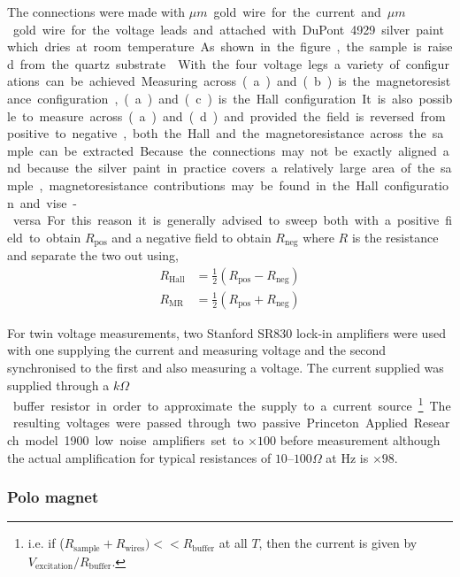 The connections were made with \unit[20]{$\mu m$} gold wire for the current and \unit[10]{$\mu m$} gold wire for the voltage leads and attached with DuPont 4929 silver paint which dries at room temperature. As shown in the figure, the sample is raised from the quartz substrate .

With the four voltage legs a variety of configurations can be achieved. Measuring across (a) and (b) is the magnetoresistance configuration, (a) and (c) is the Hall configuration. It is also possible to measure across (a) and (d) and provided the field is reversed from positive to negative, both the Hall and the magnetoresistance across the sample can be extracted.

Because the connections may not be exactly aligned and because the silver paint in practice covers a relatively large area of the sample, magnetoresistance contributions may be found in the Hall configuration and vise-versa. For this reason it is generally advised to sweep both with a positive field to obtain $R_{\textrm{pos}}$ and a negative field to obtain $R_{\textrm{neg}}$ where $R$ is the resistance and separate the two out using,
\begin{align}
R_{\textrm{Hall}} &= \frac{1}{2}( R_{\textrm{pos}} - R_{\textrm{neg}} ) \\
R_{\textrm{MR}} &= \frac{1}{2}( R_{\textrm{pos}} + R_{\textrm{neg}} )
\end{align}

For twin voltage measurements, two Stanford SR830 lock-in amplifiers were used with one supplying the current and measuring voltage and the second synchronised to the first and also measuring a voltage. The current supplied was supplied through a \unit[1]{$k\Omega$} buffer resistor in order to approximate the supply to a current source\footnote{i.e. if ($R_{\textrm{sample}} + R_{\textrm{wires}}) << R_{\textrm{buffer}} $ at all $T$, then the current is given by $V_{\textrm{excitation}}/R_{\textrm{buffer}}$.}. The resulting voltages were passed through two passive Princeton Applied Research model 1900 low noise amplifiers set to $\times100$ before measurement although the actual amplification for typical resistances of $10$--$100\Omega$ at \unit[33]{Hz} is $\times 98$.

\subsubsection{Polo magnet}


